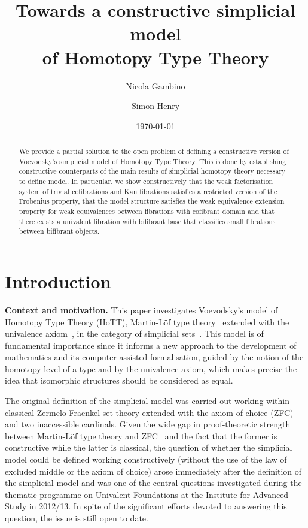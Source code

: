 \documentclass[reqno,10pt,a4paper,oneside,draft]{amsart}
\title[]{Towards a constructive  simplicial model \\ of Homotopy Type Theory}
\begin{document}
\begin{abstract}
We provide a partial solution to the open problem of defining a constructive version of 
Voevodsky's simplicial model of Homotopy Type Theory. This is done by establishing
constructive counterparts of the main results of simplicial homotopy theory
necessary to define model. In particular, 
 we show constructively that the weak factorisation system of trivial cofibrations and Kan fibrations satisfies a
restricted version of the Frobenius property, that the model structure satisfies the weak equivalence extension property
for weak equivalences between fibrations with cofibrant domain and that there exists a univalent 
 fibration with bifibrant base that classifies small fibrations between bifibrant objects.
\end{abstract}

\author{Nicola Gambino}
\address{School of Mathematics, University of Leeds, Leeds LS2 9JT, United Kingdom}


\author{Simon Henry}
\address{Department of Mathematics and Statistics, Masaryk University, Brno, Czeck Republic}


 \date{\today}
 
 

\maketitle



\section*{Introduction} 

\textbf{Context and motivation.} This paper investigates Voevodsky's model of Homotopy  Type Theory (HoTT), \ie Martin-L\"of type theory~\cite{nordstrom-petersson-smith:ml} extended with the univalence axiom~\cite{voevodsky:univalence}, in the category of simplicial sets~\cite{voevodsky-simplicial-model}. This model is of fundamental importance since it informs a new approach to the development of mathematics
and its computer-assisted formalisation, guided by the notion of the homotopy level of a type and by the univalence axiom, which makes precise the idea that isomorphic structures should be considered as equal. 

The original definition of the simplicial model  was carried out working within classical Zermelo-Fraenkel set theory extended with the axiom of choice (ZFC) and two inaccessible cardinals. Given the wide gap in proof-theoretic strength between Martin-L\"of type theory and ZFC~\cite{GrifforE:strsml} and the fact that the former is constructive  while the latter is classical,
 the question of whether the simplicial model could be defined working constructively (\ie without the use of the law of excluded middle or the axiom of choice) arose immediately after the definition of the simplicial
 model and was one of the
 central questions investigated during the thematic programme on Univalent Foundations at the Institute for Advanced Study in 2012/13. In spite of the significant efforts devoted to answering this question,
the issue is still open to date.
\end{document}
